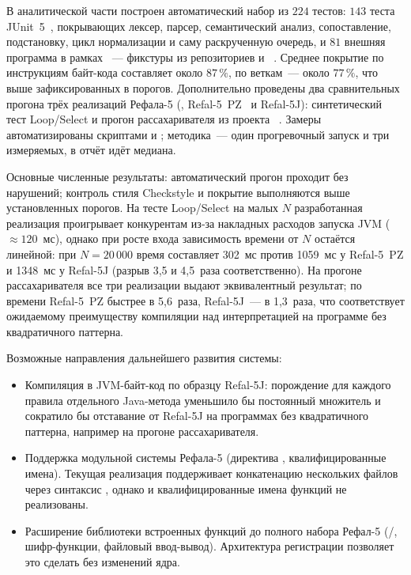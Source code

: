 В аналитической части построен автоматический набор из \(224\) тестов:
\(143\) теста JUnit~5~\cite{junit5_guide}, покрывающих лексер, парсер,
семантический анализ, сопоставление, подстановку, цикл нормализации и саму
раскрученную очередь, и \(81\) внешняя программа в рамках
~--- фикстуры из репозиториев
 и ~\cite{refal5_framework_github}.
Среднее покрытие по инструкциям байт-кода составляет около \(87\,\%\),
по веткам~--- около \(77\,\%\), что выше зафиксированных в  порогов.
Дополнительно проведены два сравнительных прогона трёх реализаций Рефала-5
(, Refal-5~PZ~\cite{refal5_home} и Refal-5J): синтетический
тест Loop/Select и прогон рассахаривателя  из проекта
~\cite{refal5_framework_github}. Замеры автоматизированы
скриптами  и ;
методика~--- один прогревочный запуск и три измеряемых, в отчёт идёт медиана.

Основные численные результаты: автоматический прогон  проходит без нарушений; контроль стиля Checkstyle и
покрытие выполняются выше установленных порогов. На тесте Loop/Select
на малых $N$ разработанная реализация проигрывает конкурентам из‑за
накладных расходов запуска JVM ($\approx 120$~мс), однако при росте входа
зависимость времени от $N$ остаётся линейной: при $N = 20\,000$ время
составляет 302~мс против 1059~мс у Refal-5~PZ и 1348~мс у Refal-5J
(разрыв 3,5 и 4,5~раза соответственно). На прогоне рассахаривателя все
три реализации выдают эквивалентный результат; по времени Refal-5~PZ
быстрее в 5,6~раза, Refal-5J~--- в 1,3~раза, что соответствует ожидаемому
преимуществу компиляции над интерпретацией на программе без квадратичного
паттерна.

Возможные направления дальнейшего развития системы:

\begin{itemize}
  \item Компиляция в JVM-байт-код по образцу Refal-5J: порождение для
        каждого правила отдельного Java-метода уменьшило бы постоянный
        множитель и сократило бы отставание от Refal-5J на программах
        без квадратичного паттерна, например на прогоне рассахаривателя.
  \item Поддержка модульной системы Рефала-5 (директива ,
        квалифицированные имена). Текущая реализация поддерживает
        конкатенацию нескольких файлов через синтаксис \prog{+}, однако
         и квалифицированные имена функций не реализованы.
  \item Расширение библиотеки встроенных функций до полного набора
        Рефал-5 (/, шифр-функции, файловый ввод-вывод).
        Архитектура регистрации позволяет это сделать без изменений ядра.
\end{itemize}

